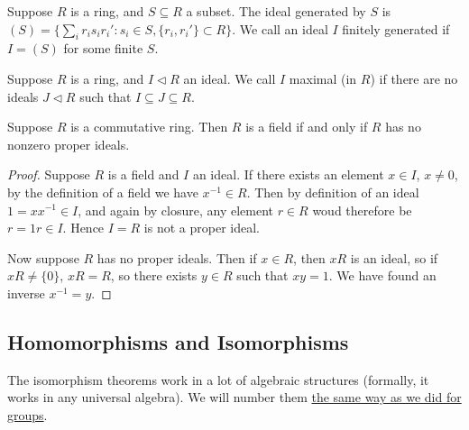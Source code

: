 \begin{definition}
    Suppose \(R\) is a ring, and \(S \subseteq R\) a subset.
    The ideal generated by \(S\) is
    \((S) = \{\sum_i r_i s_i r_i' : s_i \in S, \{r_i,r_i'\} \subset R\}\).
    We call an ideal \(I\) finitely generated
    if \(I = (S)\) for some finite \(S\).
\end{definition}
\begin{definition}
    Suppose \(R\) is a ring, and \(I \lhd R\) an ideal.
    We call \(I\) maximal (in \(R\))
    if there are no ideals \(J \lhd R\) such that \(I \subseteq J \subseteq R\).
\end{definition}

\begin{proposition}\label{prop:field-no-proper-ideals}
    Suppose \(R\) is a commutative ring.
    Then \(R\) is a field if and only if
    \(R\) has no nonzero proper ideals.
\end{proposition}
\begin{proof}
    Suppose \(R\) is a field and \(I\) an ideal.
    If there exists an element \(x \in I\), \(x \neq 0\),
    by the definition of a field we have \(x^{-1} \in R\).
    Then by definition of an ideal \(1 = xx^{-1} \in I\),
    and again by closure, any element \(r \in R\)
    woud therefore be \(r = 1r \in I\).
    Hence \(I = R\) is not a proper ideal.

    Now suppose \(R\) has no proper ideals.
    Then if \(x \in R\), then \(xR\) is an ideal,
    so if \(xR \neq \{0\}\), \(xR = R\),
    so there exists \(y \in R\) such that \(xy = 1\).
    We have found an inverse \(x^{-1} = y\).
\end{proof}


\subsection{Homomorphisms and Isomorphisms}

\begin{remark}
    The isomorphism theorems work in a lot of algebraic structures
    (formally, it works in any universal algebra).
    We will number them \hyperref[rmk:iso-numbering]{the same way as we did for groups}.
\end{remark}

